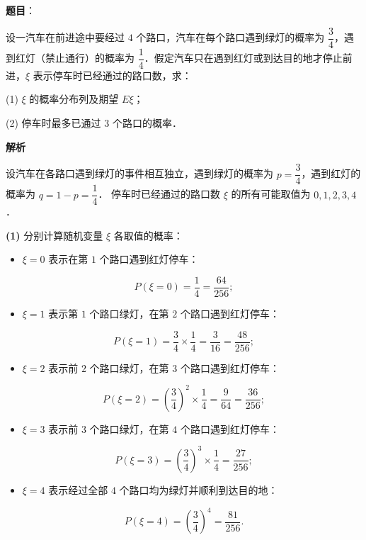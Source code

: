 \begin{answer}

\textbf{题目}：

设一汽车在前进途中要经过 $4$ 个路口，汽车在每个路口遇到绿灯的概率为 $\dfrac{3}{4}$，遇到红灯（禁止通行）的概率为 $\dfrac{1}{4}$．假定汽车只在遇到红灯或到达目的地才停止前进，$\xi$ 表示停车时已经通过的路口数，求：

(1) $\xi$ 的概率分布列及期望 $E\xi$；

(2) 停车时最多已通过 $3$ 个路口的概率．

\textbf{解析}

设汽车在各路口遇到绿灯的事件相互独立，遇到绿灯的概率为 $p = \dfrac{3}{4}$，遇到红灯的概率为 $q = 1 - p = \dfrac{1}{4}$．
停车时已经通过的路口数 $\xi$ 的所有可能取值为 $0, 1, 2, 3, 4$．

\textbf{(1)}
分别计算随机变量 $\xi$ 各取值的概率：
\begin{itemize}
\item $\xi = 0$ 表示在第 $1$ 个路口遇到红灯停车：
\end{itemize}
\nopagebreak[4]
\[
P(\xi = 0) = \frac{1}{4} = \frac{64}{256};
\]
\begin{itemize}
\item $\xi = 1$ 表示第 $1$ 个路口绿灯，在第 $2$ 个路口遇到红灯停车：
\end{itemize}
\nopagebreak[4]
\[
P(\xi = 1) = \frac{3}{4} \times \frac{1}{4} = \frac{3}{16} = \frac{48}{256};
\]
\begin{itemize}
\item $\xi = 2$ 表示前 $2$ 个路口绿灯，在第 $3$ 个路口遇到红灯停车：
\end{itemize}
\nopagebreak[4]
\[
P(\xi = 2) = \left(\frac{3}{4}\right)^2 \times \frac{1}{4} = \frac{9}{64} = \frac{36}{256};
\]
\begin{itemize}
\item $\xi = 3$ 表示前 $3$ 个路口绿灯，在第 $4$ 个路口遇到红灯停车：
\end{itemize}
\nopagebreak[4]
\[
P(\xi = 3) = \left(\frac{3}{4}\right)^3 \times \frac{1}{4} = \frac{27}{256};
\]
\begin{itemize}
\item $\xi = 4$ 表示经过全部 $4$ 个路口均为绿灯并顺利到达目的地：
\end{itemize}
\nopagebreak[4]
\[
P(\xi = 4) = \left(\frac{3}{4}\right)^4 = \frac{81}{256}.
\]


\end{answer}
